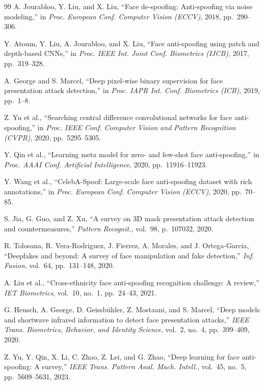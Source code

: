 \documentclass[11pt]{article}
\begin{document}
\begin{thebibliography}{99}
 A. Jourabloo, Y. Liu, and X. Liu, ``Face de-spoofing: Anti-spoofing via noise modeling,'' in \emph{Proc. European Conf. Computer Vision (ECCV)}, 2018, pp.\ 290--306.

 Y. Atoum, Y. Liu, A. Jourabloo, and X. Liu, ``Face anti-spoofing using patch and depth-based CNNs,'' in \emph{Proc. IEEE Int. Joint Conf. Biometrics (IJCB)}, 2017, pp.\ 319--328.

 A. George and S. Marcel, ``Deep pixel-wise binary supervision for face presentation attack detection,'' in \emph{Proc. IAPR Int. Conf. Biometrics (ICB)}, 2019, pp.\ 1--8.

 Z. Yu et al., ``Searching central difference convolutional networks for face anti-spoofing,'' in \emph{Proc. IEEE Conf. Computer Vision and Pattern Recognition (CVPR)}, 2020, pp.\ 5295--5305.

 Y. Qin et al., ``Learning meta model for zero- and few-shot face anti-spoofing,'' in \emph{Proc. AAAI Conf. Artificial Intelligence}, 2020, pp.\ 11916--11923.

 Y. Wang et al., ``CelebA-Spoof: Large-scale face anti-spoofing dataset with rich annotations,'' in \emph{Proc. European Conf. Computer Vision (ECCV)}, 2020, pp.\ 70--85.

 S. Jia, G. Guo, and Z. Xu, ``A survey on 3D mask presentation attack detection and countermeasures,'' \emph{Pattern Recognit.}, vol.\ 98, p.\ 107032, 2020.

 R. Tolosana, R. Vera-Rodriguez, J. Fierrez, A. Morales, and J. Ortega-Garcia, ``Deepfakes and beyond: A survey of face manipulation and fake detection,'' \emph{Inf. Fusion}, vol.\ 64, pp.\ 131--148, 2020.

 A. Liu et al., ``Cross-ethnicity face anti-spoofing recognition challenge: A review,'' \emph{IET Biometrics}, vol.\ 10, no.\ 1, pp.\ 24--43, 2021.

 G. Heusch, A. George, D. Geissb\"uhler, Z. Mostaani, and S. Marcel, ``Deep models and shortwave infrared information to detect face presentation attacks,'' \emph{IEEE Trans. Biometrics, Behavior, and Identity Science}, vol.\ 2, no.\ 4, pp.\ 399--409, 2020.

 Z. Yu, Y. Qin, X. Li, C. Zhao, Z. Lei, and G. Zhao, ``Deep learning for face anti-spoofing: A survey,'' \emph{IEEE Trans. Pattern Anal. Mach. Intell.}, vol.\ 45, no.\ 5, pp.\ 5609--5631, 2023.


\end{thebibliography}
\end{document}
